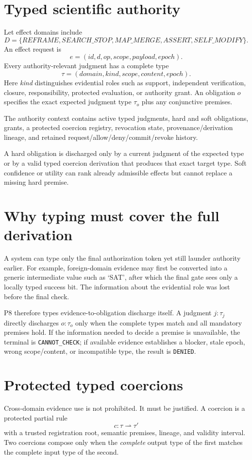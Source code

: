 \documentclass[11pt]{article}
\begin{document}
\section{Typed scientific authority}
Let effect domains include
\[
D=\{REFRAME, SEARCH\_STOP, MAP\_MERGE, ASSERT, SELF\_MODIFY\}.
\]
An effect request is
\[
e=(id,d,op,scope,payload,epoch).
\]
Every authority-relevant judgment has a complete type
\[
\tau=(domain,kind,scope,content,epoch).
\]
Here \emph{kind} distinguishes evidential roles such as support, independent verification, closure, responsibility, protected evaluation, or authority grant. An obligation $o$ specifies the exact expected judgment type $\tau_o$ plus any conjunctive premises.

The authority context contains active typed judgments, hard and soft obligations, grants, a protected coercion registry, revocation state, provenance/derivation lineage, and retained request/allow/deny/commit/revoke history.

A hard obligation is discharged only by a current judgment of the expected type or by a valid typed coercion derivation that produces that exact target type. Soft confidence or utility can rank already admissible effects but cannot replace a missing hard premise.

\section{Why typing must cover the full derivation}
A system can type only the final authorization token yet still launder authority earlier. For example, foreign-domain evidence may first be converted into a generic intermediate value such as `SAT', after which the final gate sees only a locally typed success bit. The information about the evidential role was lost before the final check.

P8 therefore types evidence-to-obligation discharge itself. A judgment $j:\tau_j$ directly discharges $o:\tau_o$ only when the complete types match and all mandatory premises hold. If the information needed to decide a premise is unavailable, the terminal is \texttt{CANNOT\_CHECK}; if available evidence establishes a blocker, stale epoch, wrong scope/content, or incompatible type, the result is \texttt{DENIED}.

\section{Protected typed coercions}
Cross-domain evidence use is not prohibited. It must be justified. A coercion is a protected partial rule
\[
c:\tau\rightharpoonup\tau'
\]
with a trusted registration root, semantic premises, lineage, and validity interval. Two coercions compose only when the \emph{complete} output type of the first matches the complete input type of the second.
\end{document}
